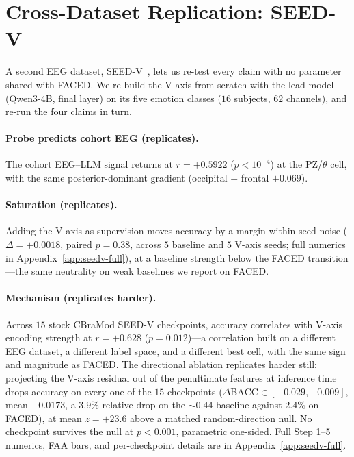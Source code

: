 \section{Cross-Dataset Replication: SEED-V}
\label{sec:vaxis-brain-seedv}

A second EEG dataset, SEED-V~\citep{liu2022seedv}, lets us re-test
every claim with no parameter shared with FACED. We re-build the
V-axis from scratch with the lead model (Qwen3-4B, final layer)
on its five emotion classes ($16$ subjects, $62$ channels), and re-run
the four claims in turn.

\paragraph{Probe predicts cohort EEG (replicates).}
The cohort EEG--LLM signal returns at $r{=}{+}0.5922$ ($p<10^{-4}$)
at the PZ/$\theta$ cell, with the same posterior-dominant gradient
(occipital $-$ frontal $+0.069$).

\paragraph{Saturation (replicates).}
Adding the V-axis as supervision moves accuracy by a margin within
seed noise ($\Delta{=}{+}0.0018$, paired $p{=}0.38$, across $5$ baseline
and $5$ V-axis seeds; full numerics in Appendix~\ref{app:seedv-full}), at a baseline
strength below the FACED transition---the same neutrality on weak
baselines we report on FACED.

\paragraph{Mechanism (replicates harder).}
Across $15$ stock CBraMod SEED-V checkpoints, accuracy correlates
with V-axis encoding strength at $r{=}{+}0.628$ ($p{=}0.012$)---a
correlation built on a different EEG dataset, a different label
space, and a different best cell, with the same sign and magnitude
as FACED. The directional ablation replicates harder still:
projecting the V-axis residual out of the penultimate features at
inference time drops accuracy on every one of the $15$ checkpoints
($\Delta\mathrm{BACC} \in [-0.029, -0.009]$, mean $-0.0173$, a
$3.9\%$ relative drop on the $\sim 0.44$ baseline against $2.4\%$
on FACED), at mean $z{=}{+}23.6$ above a matched random-direction
null. No checkpoint survives the null at $p<0.001$, parametric
one-sided. Full Step 1--5 numerics, FAA bars, and per-checkpoint
details are in Appendix~\ref{app:seedv-full}.
